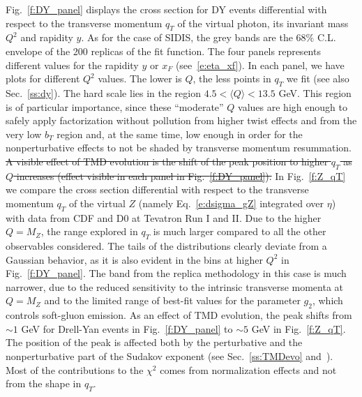 \documentclass[aps,preprintnumbers,showpacs,nofootinbib,superscriptaddress,floatfix]{revtex4}
\newcommand{\AS}[1]{{\textcolor[rgb]{1,0,1}{#1}}}
\begin{document}

Fig.~\ref{f:DY_panel} displays the cross section for DY events differential with respect to the transverse momentum $q_T$ of the virtual photon, its invariant mass $Q^2$ and rapidity $y$.  
As for the case of SIDIS, the grey bands are the $68\%$ C.L. envelope of the 200 replicas of the fit function. The four panels represents different values for the rapidity $y$ or $x_F$ (see~\eqref{e:eta_xf}). In each panel, we have plots for different $Q^2$ values.
The lower is $Q$, the less points in $q_T$ we fit (see also Sec.~\ref{ss:dy}). 
The hard scale lies in the region $4.5 < \langle Q \rangle < 13.5$ GeV. This region is of particular importance, since these ``moderate'' $Q$ values are high enough to safely apply factorization without pollution from higher twist effects and from the very low $b_T$ region and, at the same time, low enough in order for the nonperturbative effects to not be shaded by transverse momentum resummation.
\AS{\sout{A visible effect of TMD evolution is the shift of the peak position to higher $q_T$ as $Q$ increases (effect visible in each panel in Fig.~\ref{f:DY_panel}). }}
In Fig.~\ref{f:Z_qT} we compare the cross section differential with respect to the transverse momentum $q_T$ of the virtual $Z$ (namely Eq.~\eqref{e:dsigma_gZ} integrated over $\eta$) with data from CDF and D0 at Tevatron Run I and II. 
Due to the higher $Q = M_Z$, the range explored in $q_T$ is much larger compared to all the other observables considered. The tails of the distributions clearly deviate from a Gaussian behavior, as it is also evident in the bins at higher $Q^2$ in Fig.~\ref{f:DY_panel}. The band from the replica methodology in this case is much narrower, due to the reduced sensitivity to the intrinsic transverse momenta at $Q=M_Z$ and to the limited range of best-fit values for the parameter $g_2$, which controls soft-gluon emission. 
As an effect of TMD evolution, the peak shifts from $\sim 1$ GeV for Drell-Yan events in Fig.~\ref{f:DY_panel} to $\sim 5$ GeV in Fig.~\ref{f:Z_qT}. The position of the peak is affected both by the perturbative and the nonperturbative part of the Sudakov exponent (see Sec.~\ref{ss:TMDevo} and~\cite{Signori:2016lvd}).
Most of the contributions to the $\chi^2$ comes from normalization effects and not from the shape in $q_T$. 
\end{document}
